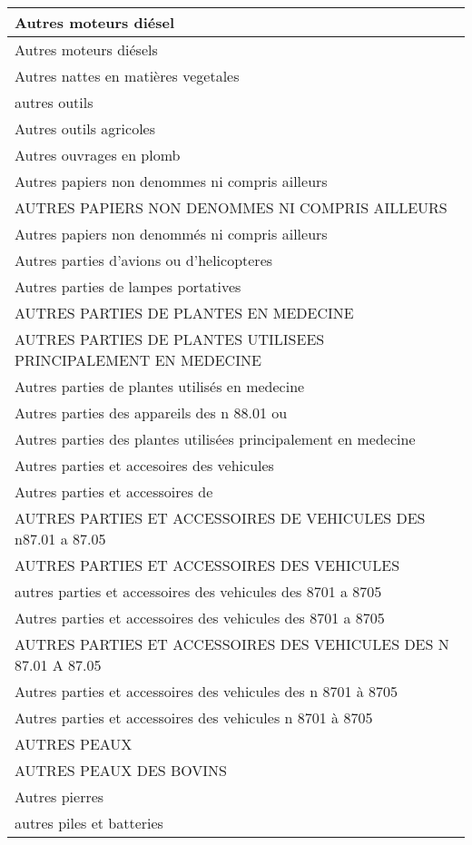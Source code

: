 \documentclass[
]{book}
\begin{document}
\begin{table}
\begin{tabular}[t]{l}
\hline
Autres moteurs diésel\\
\hline
Autres moteurs diésels\\
\hline
Autres nattes en matières vegetales\\
\hline
autres outils\\
\hline
Autres outils agricoles\\
\hline
Autres ouvrages en plomb\\
\hline
Autres papiers non denommes ni compris ailleurs\\
\hline
AUTRES PAPIERS NON DENOMMES NI COMPRIS AILLEURS\\
\hline
Autres papiers non denommés ni compris ailleurs\\
\hline
Autres parties d'avions ou d'helicopteres\\
\hline
Autres parties de lampes portatives\\
\hline
AUTRES PARTIES DE PLANTES EN MEDECINE\\
\hline
AUTRES PARTIES DE PLANTES UTILISEES PRINCIPALEMENT EN MEDECINE\\
\hline
Autres parties de plantes utilisés en medecine\\
\hline
Autres parties des appareils des n 88.01 ou\\
\hline
Autres parties des plantes utilisées principalement en medecine\\
\hline
Autres parties et accesoires des vehicules\\
\hline
Autres parties et accessoires de\\
\hline
AUTRES PARTIES ET ACCESSOIRES DE VEHICULES DES n87.01 a 87.05\\
\hline
AUTRES PARTIES ET ACCESSOIRES DES VEHICULES\\
\hline
autres parties et accessoires des vehicules des 8701 a 8705\\
\hline
Autres parties et accessoires des vehicules des 8701 a 8705\\
\hline
AUTRES PARTIES ET ACCESSOIRES DES VEHICULES DES N 87.01 A 87.05\\
\hline
Autres parties et accessoires des vehicules des n 8701 à 8705\\
\hline
Autres parties et accessoires des vehicules n 8701 à 8705\\
\hline
AUTRES PEAUX\\
\hline
AUTRES PEAUX DES BOVINS\\
\hline
Autres pierres\\
\hline
autres piles et batteries\\

\end{tabular}
\end{table}
\end{document}
